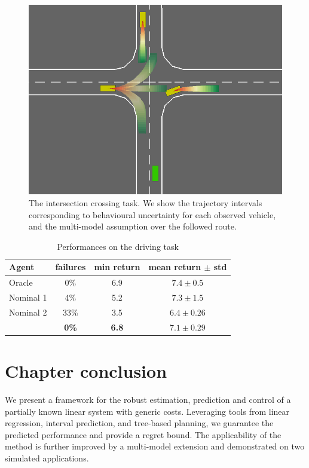 \begin{figure}[t]
	\centering
	\includegraphics[width=0.7\linewidth]{img/highway-small}
	\caption{The intersection crossing task. We show the trajectory intervals corresponding to behavioural uncertainty for each observed vehicle, and the multi-model assumption over the followed route.}
\end{figure}

\begin{table}[t]
	\caption{Performances on the driving task}
	\label{tab:driving}
	\centering
	\begin{tabular}{lccc}
		\toprule
		Agent &
		failures &
		min return &
		mean return $\pm$ std  \\
		\midrule
		Oracle & 0\% & {6.9} & $7.4 \pm 0.5$ \\
		\midrule
		{Nominal 1} & 4\% & {5.2} & $\mathbf{7.3} \pm 1.5$ \\
		{Nominal 2} & 33\% & {3.5} & $6.4 \pm 0.26$ \\
		\Cref{alg:full} & \textbf{0\%} & \textbf{6.8} & $7.1 \pm 0.29$ \\
		\bottomrule
	\end{tabular}
\end{table}

\section*{Chapter conclusion}

We present a framework for the robust estimation, prediction and control of a partially known linear system with generic costs. Leveraging tools from linear regression, interval prediction, and tree-based planning, we guarantee the predicted performance and provide a regret bound. The applicability of the method is further improved by a multi-model extension and demonstrated on two simulated applications.

